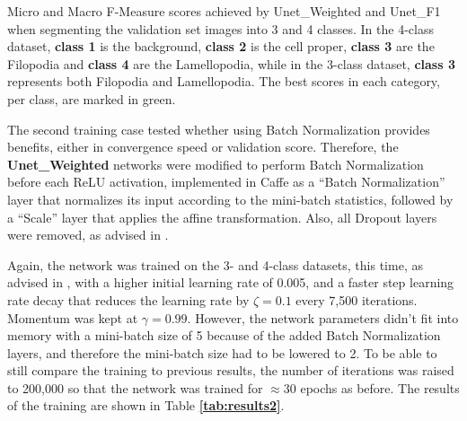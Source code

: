 \begin {table}
\caption[]{Micro and Macro F-Measure scores achieved by Unet\_Weighted and Unet\_F1 when segmenting the validation set images into 3 and 4 classes. In the 4-class dataset, \textbf{class 1} is the background, \textbf{class 2} is the cell proper, \textbf{class 3} are the Filopodia and \textbf{class 4} are the Lamellopodia, while in the 3-class dataset, \textbf{class 3} represents both Filopodia and Lamellopodia. The best scores in each category, per class, are marked in green.}
\label{tab:results1}
\end {table}

\noindent The second training case tested whether using Batch Normalization provides benefits, either in convergence speed or validation score. Therefore, the \textbf{Unet\_Weighted} networks were modified to perform Batch Normalization before each ReLU activation, implemented in Caffe as a ``Batch Normalization'' layer that normalizes its input according to the mini-batch statistics, followed by a ``Scale'' layer that applies the affine transformation. Also, all Dropout layers were removed, as advised in \cite{batchnorm}.

Again, the network was trained on the 3- and 4-class datasets, this time, as advised in \cite{batchnorm}, with a higher initial learning rate of 0.005, and a faster step learning rate decay that reduces the learning rate by $\zeta = 0.1$ every 7,500 iterations. Momentum was kept at $\gamma = 0.99$. However, the network parameters didn't fit into memory with a mini-batch size of 5 because of the added Batch Normalization layers, and therefore the mini-batch size had to be lowered to 2. To be able to still compare the training to previous results, the number of iterations was raised to 200,000 so that the network was trained for $\approx$30 epochs as before. The results of the training are shown in Table \textbf{\ref{tab:results2}}.


